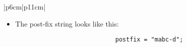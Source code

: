 \begin{center}
\begin{longtable}{ |p{6cm}|p{11cm}| }
\begin{itemize}
{\begin{center}
                            \begin{tabular}{ c }
                                \texttt{OperandStack =} \\ \\
                            \end{tabular}
                            \begin{bytefield}{10}
                                     \\
                            \end{bytefield}
                        \end{center}
                    }
                
                \item The post-fix string looks like this:
                    {
                        \begin{verbatim}
                            postfix = "mabc-d";
                        \end{verbatim}
                    }
            \end{itemize}
            \\ 
        \hline 
        \hline
        
         \\
            

\end{longtable}
\end{center}
